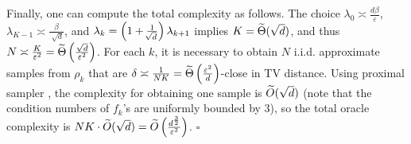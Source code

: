 Finally, one can compute the total complexity as follows. The choice $\lambda_0\asymp\frac{d\beta}{\varepsilon}$, $\lambda_{K-1}\asymp\frac{\beta}{\sqrt[]{d}}$, and $\lambda_k=\left(1+\frac{1}{\sqrt[]{d}}\right)\lambda_{k+1}$ implies $K=\widetilde{\Theta}(\sqrt{d})$, and thus $N\asymp\frac{K}{\varepsilon^2}=\widetilde{\Theta}\left(\frac{\sqrt{d}}{\varepsilon^2}\right)$. For each $k$, it is necessary to obtain $N$ i.i.d. approximate samples from $\rho_k$ that are $\delta\asymp\frac{1}{NK}=\widetilde{\Theta}\left(\frac{\varepsilon^2}{d}\right)$-close in TV distance. Using proximal sampler \citep{fan2023improved}, the complexity for obtaining one sample is $\widetilde{O}(\sqrt{d})$ (note that the condition numbers of $f_k$'s are uniformly bounded by $3$), so the total oracle complexity is $NK\cdot\widetilde{O}(\sqrt{d})=\widetilde{O}\left(\frac{d^\frac{3}{2}}{\varepsilon^2}\right)$. 
\hfill$\square$